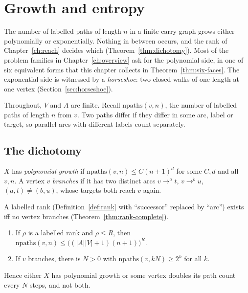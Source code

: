 \chapter{Growth and entropy}\label{ch:entropy}

The number of labelled paths of length \(n\) in a finite carry graph grows either polynomially
or exponentially. Nothing in between occurs, and the rank of Chapter~\ref{ch:reach} decides
which (Theorem~\ref{thm:dichotomy}). Most of the problem families in Chapter~\ref{ch:overview}
ask for the polynomial side, in one of six equivalent forms that this chapter collects in
Theorem~\ref{thm:six-faces}. The exponential side is witnessed by a \emph{horseshoe}: two
closed walks of one length at one vertex (Section~\ref{sec:horseshoe}).

Throughout, \(V\) and \(A\) are finite. Recall \(\mathrm{npaths}(v,n)\), the number of labelled
paths of length \(n\) from \(v\). Two paths differ if they differ in some arc, label or
target, so parallel arcs with different labels count separately.

\section{The dichotomy}

\begin{definition}\label{def:branch}
\(X\) has \emph{polynomial growth} if \(\mathrm{npaths}(v,n)\le C(n+1)^d\) for some \(C,d\) and
all \(v,n\). A vertex \(v\) \emph{branches} if it has two distinct arcs \(v\to^a t\),
\(v\to^b u\), \((a,t)\neq(b,u)\), whose targets both reach \(v\) again.
\end{definition}

A labelled rank (Definition~\ref{def:rank} with ``successor'' replaced by ``arc'') exists iff no
vertex branches (Theorem~\ref{thm:rank-complete}).

\begin{theorem}\label{thm:dichotomy}
\begin{enumerate}[label=(\alph*)]
\item If \(\rho\) is a labelled rank and \(\rho\le R\), then
  \(\mathrm{npaths}(v,n)\le\bigl((|A||V|+1)(n+1)\bigr)^R\).
\item If \(v\) branches, there is \(N>0\) with \(\mathrm{npaths}(v,kN)\ge 2^k\) for all \(k\).
\end{enumerate}
Hence either \(X\) has polynomial growth or some vertex doubles its path count every \(N\)
steps, and not both.
\end{theorem}

